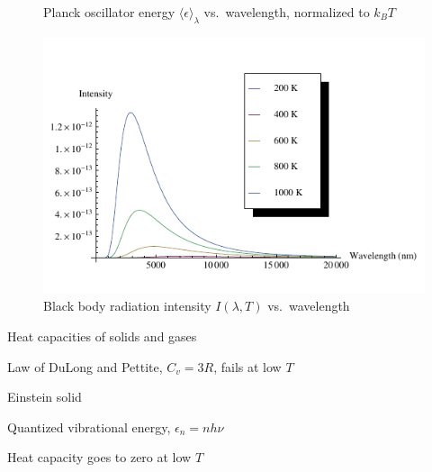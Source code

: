 \documentclass[11pt]{article}
\begin{document}
\begin{outline}
\begin{outline}
\begin{figure}
\begin{center}
\caption{Planck oscillator energy $\langle \epsilon \rangle_\lambda$ vs.\ wavelength,
  normalized to $k_B T$}
\end{center}
\end{figure}
\begin{figure}
\begin{center}
\includegraphics[scale=1.25]{Images/BlackBody.pdf}
\caption{Black body radiation intensity $I(\lambda,T)$ vs.\ wavelength}
\end{center}
\end{figure}

  \item{Heat capacities of solids and gases}
    \begin{outline}
    \item Law of DuLong and Pettite, $C_v = 3R$, fails at low $T$
    \item Einstein solid
      \begin{outline}
      \item Quantized vibrational energy, $\epsilon_n=nh\nu$
      \item Heat capacity goes to zero at low $T$
      \end{outline}
  \end{outline}


\end{outline}
\end{outline}
\end{document}
